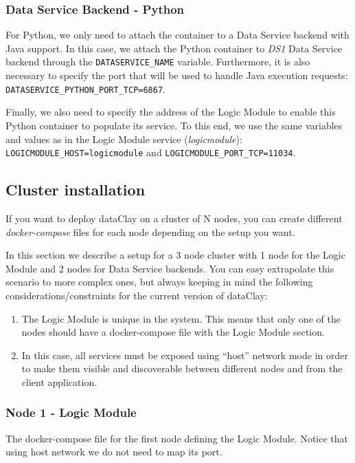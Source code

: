 \subsubsection{Data Service Backend - Python}
For Python, we only need to attach the container to a Data Service backend with Java support. In this case, we attach the Python container to \textit{DS1} Data Service backend through the \texttt{DATASERVICE\_NAME} variable. Furthermore, it is also necessary to specify the port that will be used to handle Java execution requests: \texttt{DATASERVICE\_PYTHON\_PORT\_TCP=6867}.

Finally, we also need to specify the address of the Logic Module to enable this Python container to populate its service. To this end, we use the same variables and values as in the Logic Module service (\textit{logicmodule}): \texttt{LOGICMODULE\_HOST=logicmodule} and \texttt{LOGICMODULE\_PORT\_TCP=11034}.

\subsection{Cluster installation}

If you want to deploy dataClay on a cluster of N nodes, you can create different \textit{docker-compose} files for each node depending on the setup you want.

In this section we describe a setup for a 3 node cluster with 1 node for the Logic Module and 2 nodes for Data Service backends. You can easy extrapolate this scenario to more complex ones, but always keeping in mind the following considerations/constraints for the current version of dataClay:

\begin{enumerate}
 \item The Logic Module is unique in the system. This means that only one of the nodes should have a docker-compose file with the Logic Module section.
 \item In this case, all services must be exposed using ``host'' network mode in order to make them visible and discoverable between different nodes and from the client application.
\end{enumerate}

\subsubsection{Node 1 - Logic Module}

The docker-compose file for the first node defining the Logic Module. Notice that using host network we do not need to map its port.


